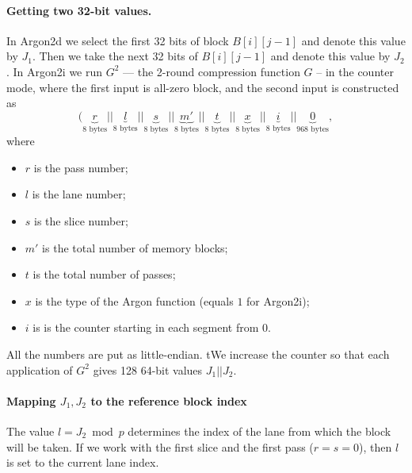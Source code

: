 \documentclass[a4paper]{article}
\begin{document}
\paragraph{Getting two 32-bit values.} In Argon2d we select  the first 32 bits of  block $B[i][j-1]$ and denote this value by $J_1$. Then we take the next 32 bits of $B[i][j-1]$ and denote this value by $J_2$. In \textsf{Argon2i} we run $G^2$ --- the 2-round compression function $G$ -- in the counter mode, where the first input is all-zero block, and the second input is constructed as 
  $$
  (\underbrace{r}_{\text{8 bytes}}||\underbrace{l}_{\text{8 bytes}}||\underbrace{s}_{\text{8 bytes}}||\underbrace{m'}_{\text{8 bytes}}||\underbrace{t}_{\text{8 bytes}}||\underbrace{x}_{\text{8 bytes}}||\underbrace{i}_{\text{8 bytes}}||\underbrace{0}_{\text{968 bytes}},
  $$ where
  \begin{itemize}
  \item $r$ is the pass number;
  \item $l$ is the lane number;
  \item $s$ is the slice number;
  \item $m'$ is the total number of memory blocks;
  \item $t$ is the total number of passes;
  \item $x$ is the type of the Argon function (equals $1$ for \textsf{Argon2i});
  \item $i$ is is the counter starting in each segment from 0.
  \end{itemize} All the numbers are put as little-endian. tWe increase the counter so that each application of $G^2$ gives 128 64-bit values $J_1||J_2$.
  
 \paragraph{Mapping $J_1,J_2$ to the reference block index} The value $l = J_2 \bmod p$ determines the index of the lane from which the block will be taken. If we work with the first slice and the first pass ($r=s=0$), then $l$ is set to the current lane index.  
 
\end{document}
